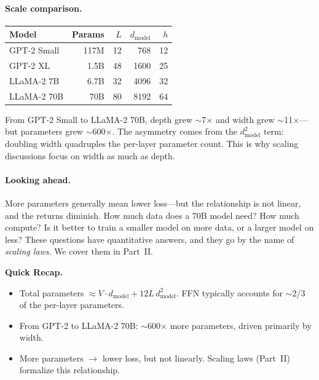 \paragraph{Scale comparison.}

\begin{center}
\begin{tabular}{lrrrr}
\toprule
\textbf{Model} & \textbf{Params} & $L$ & $d_{\text{model}}$ & $h$ \\
\midrule
GPT-2 Small   &   117M &  12 &   768 &  12 \\
GPT-2 XL      &  1.5B  &  48 &  1600 &  25 \\
LLaMA-2 7B    &  6.7B  &  32 &  4096 &  32 \\
LLaMA-2 70B   & 70B    &  80 &  8192 &  64 \\
\bottomrule
\end{tabular}
\end{center}

\noindent From GPT-2 Small to LLaMA-2 70B, depth grew $\sim$7$\times$ and width grew $\sim$11$\times$---but parameters grew $\sim$600$\times$. The asymmetry comes from the $d_\text{model}^2$ term: doubling width quadruples the per-layer parameter count. This is why scaling discussions focus on width as much as depth.

\paragraph{Looking ahead.} More parameters generally mean lower loss---but the relationship is not linear, and the returns diminish. How much data does a 70B model need? How much compute? Is it better to train a smaller model on more data, or a larger model on less? These questions have quantitative answers, and they go by the name of \emph{scaling laws}. We cover them in Part~II.

\begin{quickrecap}
\textbf{Quick Recap.}
\begin{itemize}[nosep,leftmargin=1.5em]
  \item Total parameters $\approx V \cdot d_\text{model} + 12 L \, d_\text{model}^2$. FFN typically accounts for $\sim$2/3 of the per-layer parameters.
  \item From GPT-2 to LLaMA-2 70B: $\sim$600$\times$ more parameters, driven primarily by width.
  \item More parameters $\to$ lower loss, but not linearly. Scaling laws (Part~II) formalize this relationship.
\end{itemize}
\end{quickrecap}


